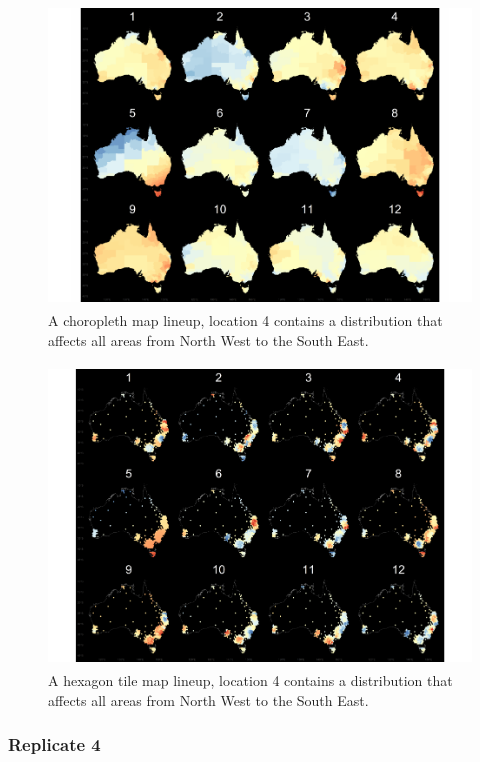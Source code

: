 \documentclass{monashthesis}
\begin{document}
\begin{figure}[H]
\centering
\includegraphics[height=8cm]{lineups/nwse-geo5-1.pdf}
\caption{\label{fig:nwse-geo5}A choropleth map lineup, location 4 contains a distribution that affects all areas from North West to the South East.}
\end{figure}

\begin{figure}[H]
\centering
\includegraphics[height=8cm]{lineups/nwse-hex5-1.pdf}
\caption{\label{fig:nwse-hex5}A hexagon tile map lineup, location 4 contains a distribution that affects all areas from North West to the South East.}
\end{figure}

\hypertarget{replicate-4-2}{%
\subsubsection{Replicate 4}\label{replicate-4-2}}
\end{document}
